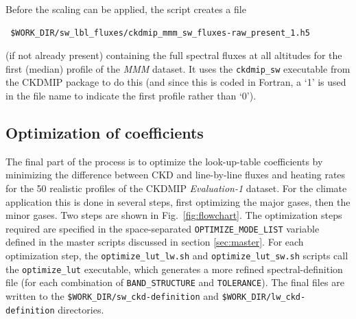 \documentclass[a4,oneside]{article}
\def\codesize{\small}
\def\codesize{\small}
\def\code#1{{\codesize\texttt{#1}}}
\begin{document}
Before the scaling can be applied, the script creates a file
\begin{lstlisting}
 $WORK_DIR/sw_lbl_fluxes/ckdmip_mmm_sw_fluxes-raw_present_1.h5
\end{lstlisting}
(if not already present) containing the full spectral fluxes at all
altitudes for the first (median) profile of the \emph{MMM} dataset. It
uses the \code{ckdmip\_sw} executable from the CKDMIP package to do
this (and since this is coded in Fortran, a `1' is used in the file
name to indicate the first profile rather than `0').

\subsection{Optimization of coefficients}
The final part of the process is to optimize the look-up-table
coefficients by minimizing the difference between CKD and line-by-line
fluxes and heating rates for the 50 realistic profiles of the CKDMIP
\emph{Evaluation-1} dataset. For the climate application this is done
in several steps, first optimizing the major gases, then the minor
gases. Two steps are shown in Fig.\ \ref{fig:flowchart}. The
optimization steps required are specified in the space-separated
\code{OPTIMIZE\_MODE\_LIST} variable defined in the master scripts
discussed in section \ref{sec:master}. For each optimization step, the
\code{optimize\_lut\_lw.sh} and \code{optimize\_lut\_sw.sh} scripts
call the \code{optimize\_lut} executable, which generates a more
refined spectral-definition file (for each combination of
\code{BAND\_STRUCTURE} and \code{TOLERANCE}). The final files are
written to the \code{\$WORK\_DIR/sw\_ckd-definition} and
\code{\$WORK\_DIR/lw\_ckd-definition} directories.
\end{document}
